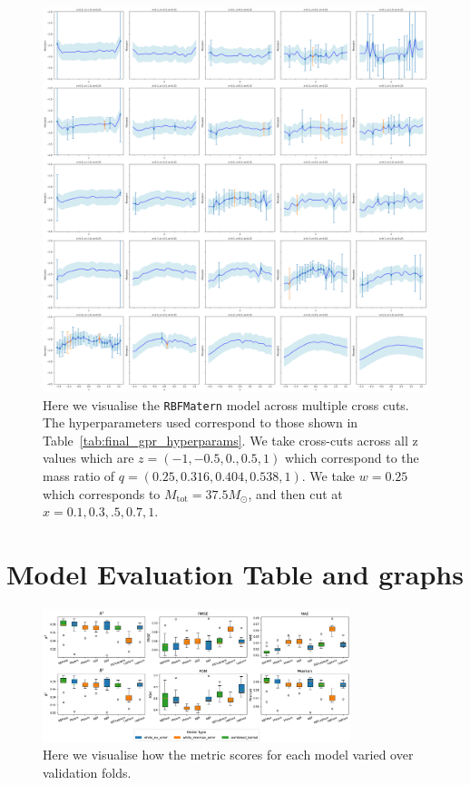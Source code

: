 \documentclass{ucdgradtaughtthesis}
\begin{document}
\begin{figure}[H]
    \centering
    \includegraphics[width=\textwidth]{LatexPlots/final_gps_plots/gps_rbfmatern_xcuts.png}
    \caption[\texttt{RBFMatern} across multiple vertical cuts (varying y)]{Here we visualise the \texttt{RBFMatern} model across multiple cross cuts. The hyperparameters used correspond to those shown in Table~\ref{tab:final_gpr_hyperparams}.
    We take cross-cuts across all z values which are \(z = (-1,-0.5,0.,0.5,1)\) which correspond to the mass ratio of \(q = (0.25,0.316,0.404,0.538,1)\).
    We take \(w = 0.25\) which corresponds to \(M_{\text{tot}} = 37.5 M_\odot\), and then cut at \(x=0.1,0.3,.5,0.7,1\).}
    \label{fig:RBF_Matern_xcuts}
\end{figure}



\section{Model Evaluation Table and graphs}
\label{appendix:model_eval_tables}

\begin{figure}[H]
    \centering
    \includegraphics[width=0.8\textwidth]{LatexPlots/CV_plots/boxplots.png}
    \caption[Box-plots of the metrics of the best 8 models.]{Here we visualise how the metric scores for each model varied 
    over validation folds.}
    \label{fig:boxplots}
\end{figure}
\end{document}
